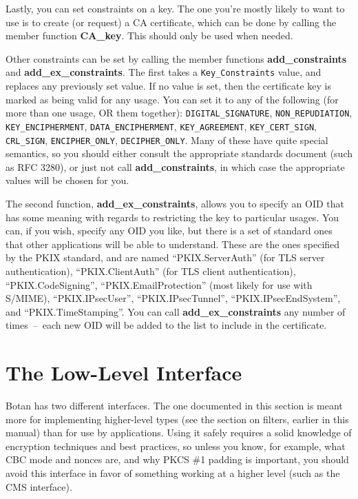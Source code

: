 \documentclass{article}
\newcommand{\function}[1]{\textbf{#1}}
\newcommand{\type}[1]{\texttt{#1}}
\begin{document}
Lastly, you can set constraints on a key. The one you're mostly likely to want
to use is to create (or request) a CA certificate, which can be done by calling
the member function \function{CA\_key}. This should only be used when needed.

Other constraints can be set by calling the member functions
\function{add\_constraints} and \function{add\_ex\_constraints}. The
first takes a \type{Key\_Constraints} value, and replaces any
previously set value. If no value is set, then the certificate key is
marked as being valid for any usage.  You can set it to any of the
following (for more than one usage, OR them together):
\type{DIGITAL\_SIGNATURE}, \type{NON\_REPUDIATION},
\type{KEY\_ENCIPHERMENT}, \type{DATA\_ENCIPHERMENT},
\type{KEY\_AGREEMENT}, \type{KEY\_CERT\_SIGN}, \type{CRL\_SIGN},
\type{ENCIPHER\_ONLY}, \type{DECIPHER\_ONLY}. Many of these have quite
special semantics, so you should either consult the appropriate
standards document (such as RFC 3280), or just not call
\function{add\_constraints}, in which case the appropriate values will
be chosen for you.

The second function, \function{add\_ex\_constraints}, allows you to specify an
OID that has some meaning with regards to restricting the key to particular
usages. You can, if you wish, specify any OID you like, but there is a set of
standard ones that other applications will be able to understand. These are
the ones specified by the PKIX standard, and are named ``PKIX.ServerAuth'' (for
TLS server authentication), ``PKIX.ClientAuth'' (for TLS client
authentication), ``PKIX.CodeSigning'', ``PKIX.EmailProtection'' (most likely
for use with S/MIME), ``PKIX.IPsecUser'', ``PKIX.IPsecTunnel'',
``PKIX.IPsecEndSystem'', and ``PKIX.TimeStamping''. You can call
\function{add\_ex\_constraints} any number of times~--~each new OID will be
added to the list to include in the certificate.

\section{The Low-Level Interface}

Botan has two different interfaces. The one documented in this section is meant
more for implementing higher-level types (see the section on filters, earlier in
this manual) than for use by applications. Using it safely requires a solid
knowledge of encryption techniques and best practices, so unless you know, for
example, what CBC mode and nonces are, and why PKCS \#1 padding is important,
you should avoid this interface in favor of something working at a higher level
(such as the CMS interface).
\end{document}
